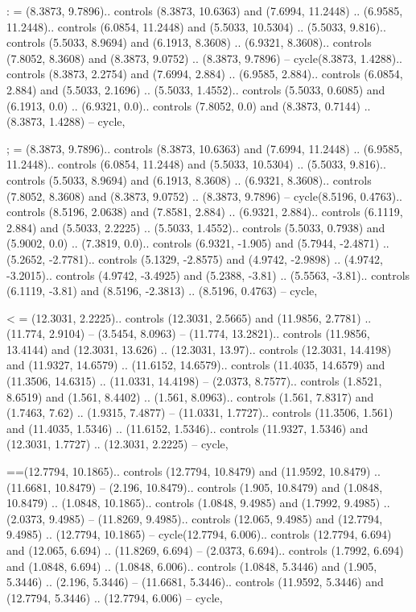 : = {(8.3873, 9.7896).. controls (8.3873, 10.6363) and (7.6994, 11.2448) .. (6.9585, 11.2448).. controls (6.0854, 11.2448) and (5.5033, 10.5304) .. (5.5033, 9.816).. controls (5.5033, 8.9694) and (6.1913, 8.3608) .. (6.9321, 8.3608).. controls (7.8052, 8.3608) and (8.3873, 9.0752) .. (8.3873, 9.7896) -- cycle(8.3873, 1.4288).. controls (8.3873, 2.2754) and (7.6994, 2.884) .. (6.9585, 2.884).. controls (6.0854, 2.884) and (5.5033, 2.1696) .. (5.5033, 1.4552).. controls (5.5033, 0.6085) and (6.1913, 0.0) .. (6.9321, 0.0).. controls (7.8052, 0.0) and (8.3873, 0.7144) .. (8.3873, 1.4288) -- cycle},

; = {(8.3873, 9.7896).. controls (8.3873, 10.6363) and (7.6994, 11.2448) .. (6.9585, 11.2448).. controls (6.0854, 11.2448) and (5.5033, 10.5304) .. (5.5033, 9.816).. controls (5.5033, 8.9694) and (6.1913, 8.3608) .. (6.9321, 8.3608).. controls (7.8052, 8.3608) and (8.3873, 9.0752) .. (8.3873, 9.7896) -- cycle(8.5196, 0.4763).. controls (8.5196, 2.0638) and (7.8581, 2.884) .. (6.9321, 2.884).. controls (6.1119, 2.884) and (5.5033, 2.2225) .. (5.5033, 1.4552).. controls (5.5033, 0.7938) and (5.9002, 0.0) .. (7.3819, 0.0).. controls (6.9321, -1.905) and (5.7944, -2.4871) .. (5.2652, -2.7781).. controls (5.1329, -2.8575) and (4.9742, -2.9898) .. (4.9742, -3.2015).. controls (4.9742, -3.4925) and (5.2388, -3.81) .. (5.5563, -3.81).. controls (6.1119, -3.81) and (8.5196, -2.3813) .. (8.5196, 0.4763) -- cycle},

< = {(12.3031, 2.2225).. controls (12.3031, 2.5665) and (11.9856, 2.7781) .. (11.774, 2.9104) -- (3.5454, 8.0963) -- (11.774, 13.2821).. controls (11.9856, 13.4144) and (12.3031, 13.626) .. (12.3031, 13.97).. controls (12.3031, 14.4198) and (11.9327, 14.6579) .. (11.6152, 14.6579).. controls (11.4035, 14.6579) and (11.3506, 14.6315) .. (11.0331, 14.4198) -- (2.0373, 8.7577).. controls (1.8521, 8.6519) and (1.561, 8.4402) .. (1.561, 8.0963).. controls (1.561, 7.8317) and (1.7463, 7.62) .. (1.9315, 7.4877) -- (11.0331, 1.7727).. controls (11.3506, 1.561) and (11.4035, 1.5346) .. (11.6152, 1.5346).. controls (11.9327, 1.5346) and (12.3031, 1.7727) .. (12.3031, 2.2225) -- cycle},

{=}={(12.7794, 10.1865).. controls (12.7794, 10.8479) and (11.9592, 10.8479) .. (11.6681, 10.8479) -- (2.196, 10.8479).. controls (1.905, 10.8479) and (1.0848, 10.8479) .. (1.0848, 10.1865).. controls (1.0848, 9.4985) and (1.7992, 9.4985) .. (2.0373, 9.4985) -- (11.8269, 9.4985).. controls (12.065, 9.4985) and (12.7794, 9.4985) .. (12.7794, 10.1865) -- cycle(12.7794, 6.006).. controls (12.7794, 6.694) and (12.065, 6.694) .. (11.8269, 6.694) -- (2.0373, 6.694).. controls (1.7992, 6.694) and (1.0848, 6.694) .. (1.0848, 6.006).. controls (1.0848, 5.3446) and (1.905, 5.3446) .. (2.196, 5.3446) -- (11.6681, 5.3446).. controls (11.9592, 5.3446) and (12.7794, 5.3446) .. (12.7794, 6.006) -- cycle},

